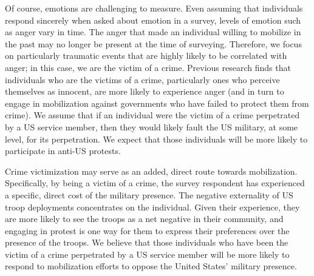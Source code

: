 		
		Of course, emotions are challenging to measure. Even assuming that individuals respond sincerely when asked about emotion in a survey, levels of emotion such as anger vary in time. The anger that made an individual willing to mobilize in the past may no longer be present at the time of surveying. Therefore, we focus on particularly traumatic events that are highly likely to be correlated with anger; in this case, we are the victim of a crime. Previous research finds that individuals who are the victims of a crime, particularly ones who perceive themselves as innocent, are more likely to experience anger (and in turn to engage in mobilization against governments who have failed to protect them from crime).\cite{Garland2012,Garcia2019} We assume that if an individual were the victim of a crime perpetrated by a US service member, then they would likely fault the US military, at some level, for its perpetration. We expect that those individuals will be more likely to participate in anti-US protests. 
		
		Crime victimization may serve as an added, direct route towards mobilization. Specifically, by being a victim of a crime, the survey respondent has experienced a specific, direct cost of the military presence. The negative externality of US troop deployments concentrates on the individual. Given their experience, they are more likely to see the troops as a net negative in their community, and engaging in protest is one way for them to express their preferences over the presence of the troops. We believe that those individuals who have been the victim of a crime perpetrated by a US service member will be more likely to respond to mobilization efforts to oppose the United States' military presence. 
		
		
		
		
